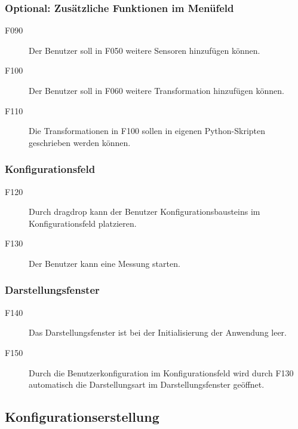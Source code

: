 \documentclass[parskip=full]{scrartcl}
\begin{document}
\subsubsection{Optional: Zusätzliche Funktionen im Menüfeld}

\begin{description}

\item[F090] Der Benutzer soll in F050 weitere Sensoren hinzufügen können.
\item[F100] Der Benutzer soll in F060 weitere Transformation hinzufügen können.
\item[F110] Die Transformationen in F100 sollen in eigenen Python-Skripten geschrieben werden können.
\end{description}

\subsubsection{Konfigurationsfeld}

\begin{description}
\item[F120] Durch \gls{dragdrop} kann der Benutzer \glspl{Konfigurationsbaustein} im Konfigurationsfeld platzieren.
\item[F130] Der Benutzer kann eine Messung starten.
\end{description}


\subsubsection{Darstellungsfenster}

\begin{description}
\item[F140] Das Darstellungsfenster ist bei der Initialisierung der Anwendung leer.
\item[F150] Durch die \gls{Benutzerkonfiguration} im Konfigurationsfeld wird durch F130 automatisch die Darstellungsart im Darstellungsfenster geöffnet.
\end{description}



\subsection{Konfigurationserstellung}
\end{document}
